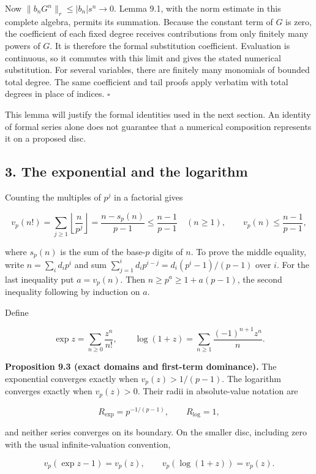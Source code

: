 \documentclass[
  11pt,
  a4paper,
]{article}
\begin{document}
Now \(\|b_nG^n\|_r\le |b_n|s^n\to0\). Lemma 9.1, with the norm estimate
in this complete algebra, permits its summation. Because the constant
term of \(G\) is zero, the coefficient of each fixed degree receives
contributions from only finitely many powers of \(G\). It is therefore
the formal substitution coefficient. Evaluation is continuous, so it
commutes with this limit and gives the stated numerical substitution.
For several variables, there are finitely many monomials of bounded
total degree. The same coefficient and tail proofs apply verbatim with
total degrees in place of indices. \(\square\)

This lemma will justify the formal identities used in the next section.
An identity of formal series alone does not guarantee that a numerical
composition represents it on a proposed disc.

\subsection{3. The exponential and the
logarithm}\label{the-exponential-and-the-logarithm}

Counting the multiples of \(p^j\) in a factorial gives

\[
v_p(n!)=\sum_{j\ge1}\left\lfloor\frac n{p^j}\right\rfloor
=\frac{n-s_p(n)}{p-1}\le\frac{n-1}{p-1}\quad(n\ge1),
\qquad
v_p(n)\le\frac{n-1}{p-1},
\tag{9.4}
\]

where \(s_p(n)\) is the sum of the base-\(p\) digits of \(n\). To prove
the middle equality, write \(n=\sum_i d_ip^i\) and sum
\(\sum_{j=1}^i d_ip^{i-j}=d_i(p^i-1)/(p-1)\) over \(i\). For the last
inequality put \(a=v_p(n)\). Then \(n\ge p^a\ge1+a(p-1)\), the second
inequality following by induction on \(a\).

Define

\[
\exp z=\sum_{n\ge0}\frac{z^n}{n!},
\qquad
\log(1+z)=\sum_{n\ge1}\frac{(-1)^{n+1}z^n}{n}.
\tag{9.5}
\]

\textbf{Proposition 9.3 (exact domains and first-term dominance).} The
exponential converges exactly when \(v_p(z)>1/(p-1)\). The logarithm
converges exactly when \(v_p(z)>0\). Their radii in absolute-value
notation are

\[
R_{\exp}=p^{-1/(p-1)},\qquad R_{\log}=1,
\tag{9.6}
\]

and neither series converges on its boundary. On the smaller disc,
including zero with the usual infinite-valuation convention,

\[
v_p(\exp z-1)=v_p(z),
\qquad v_p(\log(1+z))=v_p(z).
\tag{9.7}
\]
\end{document}
